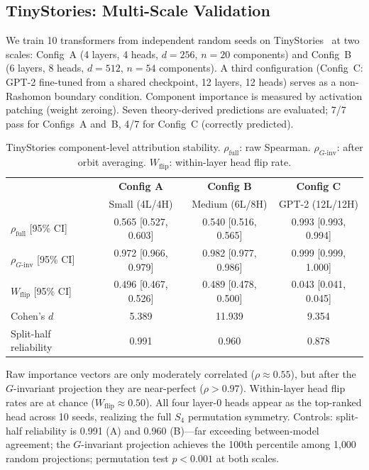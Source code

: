 \documentclass{jmlr}
\begin{document}
\subsection{TinyStories: Multi-Scale Validation}
\label{sec:tinystories}

We train 10 transformers from independent random seeds on TinyStories~\citep{eldan2023tinystories} at two scales: Config~A (4 layers, 4 heads, $d{=}256$, $n{=}20$ components) and Config~B (6 layers, 8 heads, $d{=}512$, $n{=}54$ components). A third configuration (Config~C: GPT-2 fine-tuned from a shared checkpoint, 12 layers, 12 heads) serves as a non-Rashomon boundary condition. Component importance is measured by activation patching (weight zeroing). Seven theory-derived predictions are evaluated; 7/7 pass for Configs~A and~B, 4/7 for Config~C (correctly predicted).

\begin{table}[ht]
\centering
\caption{TinyStories component-level attribution stability. $\rho_{\text{full}}$: raw Spearman. $\rho_{G\text{-inv}}$: after orbit averaging. $W_{\text{flip}}$: within-layer head flip rate.}
\label{tab:tinystories}
\small
\begin{tabular}{lccc}
\toprule
& \textbf{Config A} & \textbf{Config B} & \textbf{Config C} \\
& Small (4L/4H) & Medium (6L/8H) & GPT-2 (12L/12H) \\
\midrule
$\rho_{\text{full}}$ [95\% CI] & 0.565 [0.527, 0.603] & 0.540 [0.516, 0.565] & 0.993 [0.993, 0.994] \\
$\rho_{G\text{-inv}}$ [95\% CI] & 0.972 [0.966, 0.979] & 0.982 [0.977, 0.986] & 0.999 [0.999, 1.000] \\
\midrule
$W_{\text{flip}}$ [95\% CI] & 0.496 [0.467, 0.526] & 0.489 [0.478, 0.500] & 0.043 [0.041, 0.045] \\
Cohen's $d$ & 5.389 & 11.939 & 9.354 \\
Split-half reliability & 0.991 & 0.960 & 0.878 \\
\bottomrule
\end{tabular}
\end{table}

Raw importance vectors are only moderately correlated ($\rho \approx 0.55$), but after the $G$-invariant projection they are near-perfect ($\rho > 0.97$). Within-layer head flip rates are at chance ($W_{\text{flip}} \approx 0.50$). All four layer-0 heads appear as the top-ranked head across 10 seeds, realizing the full $S_4$ permutation symmetry. Controls: split-half reliability is 0.991 (A) and 0.960 (B)---far exceeding between-model agreement; the $G$-invariant projection achieves the 100th percentile among 1{,}000 random projections; permutation test $p < 0.001$ at both scales.
\end{document}
